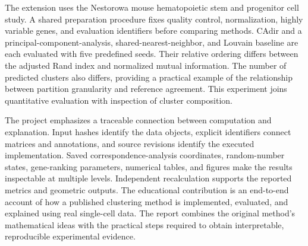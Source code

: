 The extension uses the Nestorowa mouse hematopoietic stem and progenitor cell study. A shared preparation procedure fixes quality control, normalization, highly variable genes, and evaluation identifiers before comparing methods. CAdir and a principal-component-analysis, shared-nearest-neighbor, and Louvain baseline are each evaluated with five predefined seeds. Their relative ordering differs between the adjusted Rand index and normalized mutual information. The number of predicted clusters also differs, providing a practical example of the relationship between partition granularity and reference agreement. This experiment joins quantitative evaluation with inspection of cluster composition.

The project emphasizes a traceable connection between computation and explanation. Input hashes identify the data objects, explicit identifiers connect matrices and annotations, and source revisions identify the executed implementation. Saved correspondence-analysis coordinates, random-number states, gene-ranking parameters, numerical tables, and figures make the results inspectable at multiple levels. Independent recalculation supports the reported metrics and geometric outputs. The educational contribution is an end-to-end account of how a published clustering method is implemented, evaluated, and explained using real single-cell data. The report combines the original method’s mathematical ideas with the practical steps required to obtain interpretable, reproducible experimental evidence.
\par
